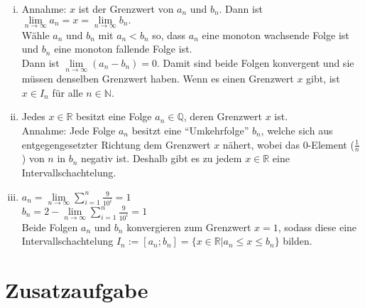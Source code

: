 \documentclass[12pt,a4paper]{article}
\begin{document}
\begin{enumerate}[(i)]
    \item Annahme: $x$ ist der Grenzwert von $a_n$ und $b_n$.
    Dann ist $\lim\limits_{n \to \infty} a_n = x = \lim\limits_{n \to \infty} b_n.$\\
    Wähle $a_n$ und $b_n$ mit $a_n < b_n$ so, dass $a_n$ eine monoton wachsende Folge ist und $b_n$ eine monoton fallende Folge ist.\\
    Dann ist $\lim\limits_{n \to \infty} (a_n - b_n) = 0$.
    Damit sind beide Folgen konvergent und sie müssen denselben Grenzwert haben.
    Wenn es einen Grenzwert $x$ gibt, ist $x \in I_n$ für alle $n \in \mathbb{N}$.

    \item Jedes $x \in \mathbb{R}$ besitzt eine Folge $a_n \in \mathbb{Q}$, deren Grenzwert $x$ ist.\\
    Annahme: Jede Folge $a_n$ besitzt eine ``Umkehrfolge'' $b_n$, welche sich aus entgegengesetzter Richtung dem Grenzwert $x$ nähert, wobei das $0$-Element ($\frac{1}{n}$) von $n$ in $b_n$ negativ ist.
    Deshalb gibt es zu jedem $x \in \mathbb{R}$ eine Intervallschachtelung.

    \item $a_n = \lim\limits_{n \to \infty} \sum\limits_{i=1}^n \frac{9}{10^i} = 1$\\
    $b_n = 2 - \lim\limits_{n \to \infty} \sum\limits_{i=1}^n \frac{9}{10^i} = 1$\\
    Beide Folgen $a_n$ und $b_n$ konvergieren zum Grenzwert $x=1$, sodass diese eine Intervallschachtelung $I_n := [a_n; b_n] = \{x \in \mathbb{R} | a_n \leq x \leq b_n\}$ bilden.
\end{enumerate}


\section*{Zusatzaufgabe}
\end{document}
